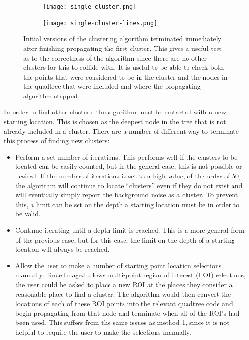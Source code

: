 \begin{figure}[tbhp]
	\centering
	\begin{subfigure}[c]{4.2cm}
		\texttt{[image: single-cluster.png]}
		\caption{}\label{fig:single-cluster-points}
	\end{subfigure}%
	\quad
	\begin{subfigure}[c]{4.2cm}
		\texttt{[image: single-cluster-lines.png]}
		\caption{}\label{fig:single-cluster-lines}
	\end{subfigure}

	\caption[Propagation of a single starting location.]{Initial versions of
		the clustering algorithm terminated immediately after finishing
		propagating the first cluster. This gives a useful test as to the
		correctness of the algorithm since there are no other clusters for this
		to collide with. It is useful to be able to check both
		 the points that were considered to
		be in the cluster and  the nodes in
		the quadtree that were included and where the propagating algorithm
		stopped.}\label{fig:single-cluster}
\end{figure}

In order to find other clusters, the algorithm must be restarted with a new
starting location. This is chosen as the deepest node in the tree that is not
already included in a cluster. There are a number of different way to terminate
this process of finding new clusters:

\begin{itemize}

	\item Perform a set number of iterations. This performs well if the
		clusters to be located can be easily counted, but in the general case,
		this is not possible or desired. If the number of iterations is set to
		a high value, of the order of 50, the algorithm will continue to locate
		``clusters'' even if they do not exist and will eventually simply
		report the background noise as a cluster. To prevent this, a limit can
		be set on the depth a starting location must be in order to be valid.

	\item Continue iterating until a depth limit is reached. This is a more
		general form of the previous case, but for this case, the limit on the
		depth of a starting location will always be reached.

	\item Allow the user to make a number of starting point location selections
		manually. Since ImageJ allows multi-point region of interest (ROI)
		selections, the user could be asked to place a new ROI at the places
		they consider a reasonable place to find a cluster. The algorithm would
		then convert the locations of each of these ROI points into the
		relevant quadtree code and begin propagating from that node and
		terminate when all of the ROI's had been used. This suffers from the
		same issues as method 1, since it is not helpful to require the user to
		make the selections manually.

\end{itemize}

